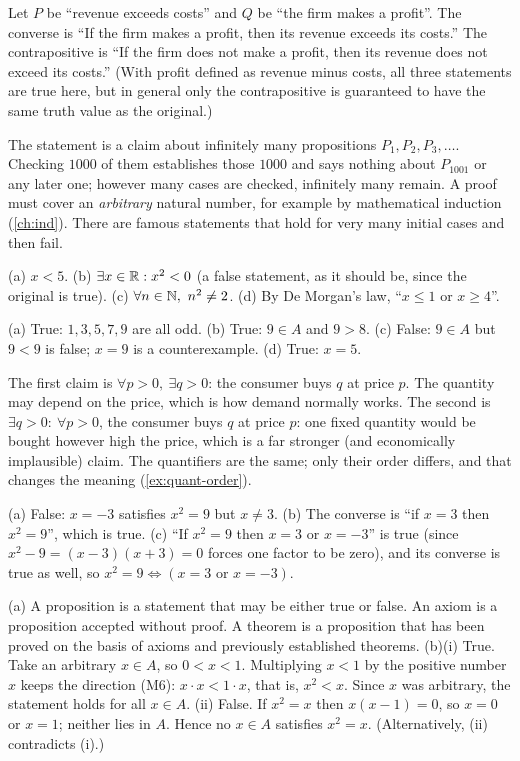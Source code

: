 Let $P$ be ``revenue exceeds costs'' and $Q$ be ``the firm makes a profit''. The converse is ``If the firm
makes a profit, then its revenue exceeds its costs.'' The contrapositive is ``If the firm does not make a
profit, then its revenue does not exceed its costs.'' (With profit defined as revenue minus costs, all
three statements are true here, but in general only the contrapositive is guaranteed to have the same
truth value as the original.)

The statement is a claim about infinitely many propositions $P_1,P_2,P_3,\dots$. Checking $1000$ of them
establishes those $1000$ and says nothing about $P_{1001}$ or any later one; however many cases are
checked, infinitely many remain. A proof must cover an \emph{arbitrary} natural number, for example by
mathematical induction (\cref{ch:ind}). There are famous statements that hold for very many initial cases
and then fail.

(a) $x<5$. (b) $\exists x\in\mathbb{R}: x^2<0$ (a false statement, as it should be, since the original is true).
(c) $\forall n\in\mathbb{N},\ n^2\ne 2$. (d) By De Morgan's law, ``$x\le 1$ or $x\ge 4$''.

(a) True: $1,3,5,7,9$ are all odd. (b) True: $9\in A$ and $9>8$. (c) False: $9\in A$ but $9<9$ is false;
$x=9$ is a counterexample. (d) True: $x=5$.

The first claim is $\forall p>0,\ \exists q>0$: the consumer buys $q$ at price $p$. The quantity may depend
on the price, which is how demand normally works. The second is $\exists q>0:\ \forall p>0$, the consumer
buys $q$ at price $p$: one fixed quantity would be bought however high the price, which is a far stronger
(and economically implausible) claim. The quantifiers are the same; only their order differs, and that
changes the meaning (\cref{ex:quant-order}).

(a) False: $x=-3$ satisfies $x^2=9$ but $x\ne3$. (b) The converse is ``if $x=3$ then $x^2=9$'', which is
true. (c) ``If $x^2=9$ then $x=3$ or $x=-3$'' is true (since $x^2-9=(x-3)(x+3)=0$ forces one factor to be
zero), and its converse is true as well, so
$x^2=9\Leftrightarrow (x=3\text{ or }x=-3)$.

(a) A proposition is a statement that may be either true or false. An axiom is a proposition accepted
without proof. A theorem is a proposition that has been proved on the basis of axioms and previously
established theorems.
(b)(i) True. Take an arbitrary $x\in A$, so $0<x<1$. Multiplying $x<1$ by the positive number $x$ keeps the
direction (M6): $x\cdot x<1\cdot x$, that is, $x^2<x$. Since $x$ was arbitrary, the statement holds for all
$x\in A$.
(ii) False. If $x^2=x$ then $x(x-1)=0$, so $x=0$ or $x=1$; neither lies in $A$. Hence no $x\in A$ satisfies
$x^2=x$. (Alternatively, (ii) contradicts (i).)
